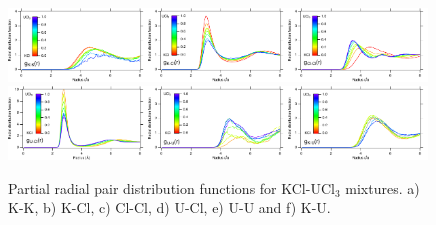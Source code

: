 \documentclass[preprint,3p,10pt,twocolumn,number,sort&compress]{elsarticle}
\begin{document}
\begin{figure}[htb]
\centering
\includegraphics[width=0.33\textwidth]{rdf1.pdf}\includegraphics[width=0.33\textwidth]{rdf2.pdf}\includegraphics[width=0.33\textwidth]{rdf3.pdf}
\includegraphics[width=0.33\textwidth]{rdf4.pdf}\includegraphics[width=0.33\textwidth]{rdf5.pdf}\includegraphics[width=0.33\textwidth]{rdf6.pdf}
\caption{Partial radial pair distribution functions for KCl-UCl$_3$ mixtures. a) K-K, b) K-Cl, c) Cl-Cl, d) U-Cl, e) U-U and f) K-U.} 
\label{fig:fig_pair}
\end{figure}

\end{document}
